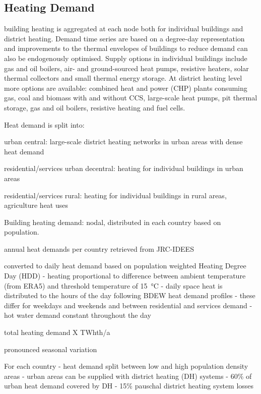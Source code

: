 \subsection{Heating Demand}

building heating is aggregated at each node both for individual buildings and district heating.
Demand time series are based on a degree-day representation and improvements to
the thermal envelopes of buildings to reduce demand can also be endogenously
optimised. Supply options in individual buildings include gas and oil boilers,
air- and ground-sourced heat pumps, resistive heaters, solar thermal collectors
and small thermal energy storage. At district heating level more options are
available: combined heat and power (CHP) plants consuming gas, coal and biomass
with and without CCS, large-scale heat pumps, pit thermal storage, gas and oil
boilers, resistive heating and fuel cells.


Heat demand is split into:

urban central: large-scale district heating networks in urban areas with dense
heat demand

residential/services urban decentral: heating for individual buildings in urban
areas

residential/services rural: heating for individual buildings in rural areas,
agriculture heat uses

Building heating demand: nodal, distributed in each country based on population.

annual heat demands per country retrieved from JRC-IDEES

converted to daily heat demand based on population weighted Heating Degree Day (HDD)
- heating proportional to difference between ambient temperature (from ERA5) and threshold temperature of \SI{15}{\celsius}
- daily space heat is distributed to the hours of the day following BDEW heat demand profiles
- these differ for weekdays and weekends and between residential and services demand
- hot water demand constant throughout the day

total heating demand X TWhth/a

pronounced seasonal variation

For each country
- heat demand split between low and high population density areas
- urban areas can be supplied with district heating (DH) systems
- 60\% of urban heat demand covered by DH
- 15\% pauschal district heating system losses

